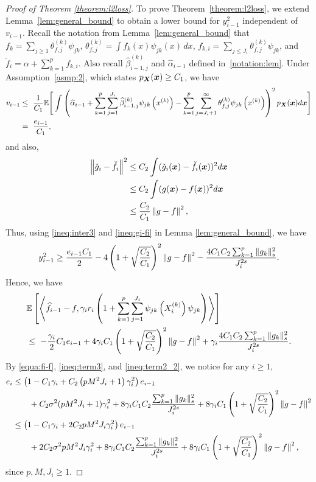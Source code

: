 \begin{proof}[Proof of Theorem \ref{theorem:l2loss}]
To prove Theorem~\ref{theorem:l2loss}, we extend Lemma~\ref{lem:general_bound} 
to obtain a lower bound for $y_{i-1}^2$ independent of $v_{i-1}$.
Recall the notation from Lemma~\ref{lem:general_bound} that  
$f_k = \sum_{j\ge1} \theta_{f,j}^{(k)}\psi_{jk}$, 
$\theta_{f,j}^{(k)} = \int f_k(x)\psi_{jk}(x)\,dx$,  
$f_{k,i} = \sum_{j\le J_i} \theta_{f,j}^{(k)}\psi_{jk}$, 
and $\check{f}_i = \alpha + \sum_{k=1}^p f_{k,i}$.  
Also recall $\hat{\beta}_{i-1,j}^{(k)}$ and $\hat{\alpha}_{i-1}$ defined in~\eqref{notation:lem}.  
Under Assumption~\ref{asmp:2}, which states $p_{\bm{X}}(\boldsymbol{x}) \ge C_1$, we have
\begin{align}
    v_{i-1}&\leq~  \frac{1}{C_1}\mathbb{E}\Bigg[\int \left(\widehat\alpha_{i-1}+\sum_{k=1}^p\sum_{j=1}^{J_i}\widehat\beta_{i-1,j}^{(k)}\psi_{jk}\left(x^{(k)}\right) - \sum_{k=1}^p\sum_{j = J_i+1}^\infty \theta_{f,j}^{(k)}\psi_{jk}\left(x^{(k)}\right)\right)^2 p_{\bm{X}}(\boldsymbol{x}) d\boldsymbol{x} \Bigg]\notag\\
    &=~ \frac{e_{i-1}}{C_1},\label{ineq:inter3}
\end{align}
and also, 
\begin{align}
    \left\|\check g_i-\check f_i\right\|^2 &\leq C_2\int (\check g_i(\boldsymbol{x})-\check f_i(\boldsymbol{x}))^2 d\boldsymbol{x} \notag\\
    &\leq  C_2\int (g(\boldsymbol{x})-f(\boldsymbol{x}))^2 d\boldsymbol{x} \notag\\
    &\leq \frac{C_2}{C_1}\left\|g-f\right\|^2, \label{ineq:gi-fi}
\end{align}
Thus, using \eqref{ineq:inter3} and \eqref{ineq:gi-fi} in Lemma \ref{lem:general_bound}, we have
\begin{align*}
    y_{i-1}^2 \geq \frac{e_{i-1}C_1}{2}- 4\left(1+\sqrt{\frac{C_2}{C_1}}\right)^2\left\|g-f\right\|^2 - \frac{4C_1C_2\sum_{k=1}^p\|g_k\|_s^2}{J_i^{2s}}.
\end{align*}
Hence, we have
\begin{align}
&\mathbb{E}\left[\left\langle \widehat{f}_{i-1}-f,\gamma_ir_i \left(1+\sum_{k=1}^p\sum_{j=1}^{J_i}\psi_{jk}\left(X_i^{(k)}\right)\psi_{jk}\right) \right\rangle\right]\notag\\
&\leq~-\frac{\gamma_i}{2}C_1e_{i-1}+ 4\gamma_iC_1\left(1+\sqrt{\frac{C_2}{C_1}}\right)^2\left\|g-f\right\|^2 + \gamma_i\frac{4C_1C_2\sum_{k=1}^p\|g_k\|_s^2}{J_i^{2s}}. \label{ineq:term2_2}
\end{align}
By \eqref{equa:fi-f}, \eqref{ineq:term3}, and \eqref{ineq:term2_2}, we notice for any $i\geq 1$,
\begin{align}
    e_i & \leq \left(1-C_1\gamma_i + C_2\left(pM^2J_i+1\right)\gamma_i^2\right)e_{i-1}\notag\\
    &\qquad +C_2\sigma^2(pM^2J_i+1)\gamma_i^2 + 8 \gamma_iC_1C_2 \frac{\sum_{k=1}^p\|g_k\|_s^2}{J_i^{2s}}+8\gamma_iC_1\left(1+\sqrt{\frac{C_2}{C_1}}\right)^2\left\|g-f\right\|^2 \notag\\
    &\leq \left(1-C_1\gamma_i + 2C_2pM^2J_i\gamma_i^2\right)e_{i-1}\notag\\
    &\qquad +2C_2\sigma^2pM^2J_i\gamma_i^2 + 8 \gamma_iC_1C_2 \frac{\sum_{k=1}^p\|g_k\|_s^2}{J_i^{2s}}+8\gamma_iC_1\left(1+\sqrt{\frac{C_2}{C_1}}\right)^2\left\|g-f\right\|^2, \label{ineq:ei}
\end{align}
since $p,M,J_i\geq 1$. 


\end{proof}
